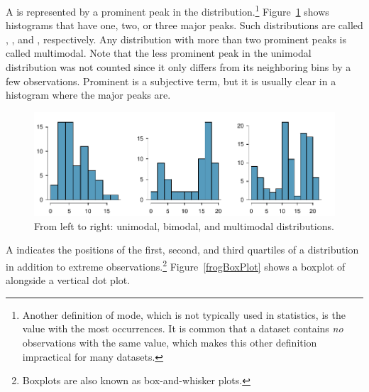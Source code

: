 \textD{\newpage}

A  is represented by a prominent peak in the distribution.\footnote{Another definition of mode, which is not typically used in statistics, is the value with the most occurrences. It is common that a dataset contains \emph{no} observations with the same value, which makes this other definition impractical for many datasets.} Figure~\ref{singleBiMultiModalPlots} shows histograms that have one, two, or three major peaks. Such distributions are called , , and , respectively. Any distribution with more than two prominent peaks is called multimodal. Note that the less prominent peak in the unimodal distribution was not counted since it only differs from its neighboring bins by a few observations. Prominent is a subjective term, but it is usually clear in a histogram where the major peaks are.  

\begin{figure}[h]
	\centering
	\includegraphics[width=\textwidth]{ch_intro_to_data_oi_biostat/figures/singleBiMultiModalPlots/singleBiMultiModalPlots}
	\caption{From left to right: unimodal, bimodal, and multimodal distributions.}
	\label{singleBiMultiModalPlots}
\end{figure}

A  indicates the positions of the first, second, and third quartiles of a distribution in addition to extreme observations.\footnote{Boxplots are also known as box-and-whisker plots.} Figure~\ref{frogBoxPlot} shows a boxplot of  alongside a vertical dot plot.

